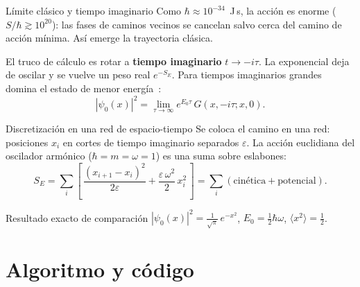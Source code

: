 \documentclass[aspectratio=169, 11pt]{beamer}
\begin{document}
\begin{frame}{Límite clásico y tiempo imaginario}
  \small
  Como $\hbar \approx 10^{-34}$~J\,s, la acción es enorme ($S/\hbar \gtrsim 10^{20}$):
  las fases de caminos vecinos se cancelan salvo cerca del camino de acción mínima.
  Así emerge la trayectoria clásica.

  \vspace{0.2cm}
  El truco de cálculo es rotar a \textbf{tiempo imaginario} $t \to -i\tau$. La
  exponencial deja de oscilar y se vuelve un peso real $e^{-S_E}$. Para tiempos
  imaginarios grandes domina el estado de menor energía~\parencite{landau_paez_2018}:
  \begin{equation*}
    |\psi_0(x)|^2 = \lim_{\tau \to \infty} e^{E_0 \tau}\, G(x, -i\tau; x, 0).
  \end{equation*}
\end{frame}

\begin{frame}{Discretización en una red de espacio-tiempo}
  \small
  Se coloca el camino en una red: posiciones $x_i$ en cortes de tiempo imaginario
  separados $\varepsilon$. La acción euclidiana del oscilador armónico
  ($\hbar = m = \omega = 1$) es una suma sobre eslabones:
  \begin{equation*}
    S_E = \sum_{i} \left[\, \frac{(x_{i+1} - x_i)^2}{2\varepsilon}
      + \frac{\varepsilon\, \omega^2}{2}\, x_i^2 \,\right]
      = \sum_i (\text{cinética} + \text{potencial}).
  \end{equation*}

  \begin{block}{Resultado exacto de comparación}
    $\displaystyle |\psi_0(x)|^2 = \frac{1}{\sqrt{\pi}}\, e^{-x^2}$,
    \quad $E_0 = \tfrac{1}{2}\hbar\omega$, \quad $\langle x^2 \rangle = \tfrac{1}{2}$.
  \end{block}
\end{frame}

\section{Algoritmo y código}
\end{document}

